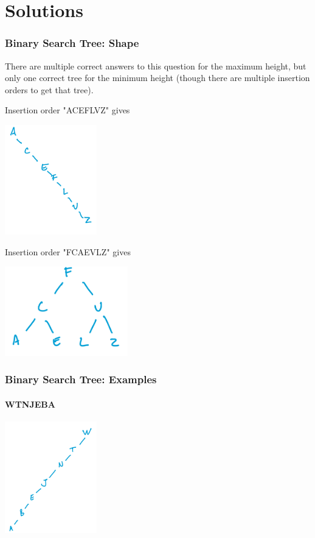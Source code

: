 \documentclass[twoside=false,DIV=14]{scrartcl}
\begin{document}
\newpage\setcounter{section}{0}
\part*{Solutions}

\section{Binary Search Tree: Shape}
\begin{note}
There are multiple correct answers to this question for the maximum height, but only one correct tree for the minimum height (though there are multiple insertion orders to get that tree).
\end{note}

Insertion order "ACEFLVZ" gives 
\begin{center}
\includegraphics[width=0.3\textwidth]{max_height.jpeg}
\end{center}

Insertion order "FCAEVLZ" gives
\begin{center}
 \includegraphics[width=0.4\textwidth]{min_height.jpeg}
 \end{center}

\section{Binary Search Tree: Examples}
\subsection{WTNJEBA}
\begin{center}
  \includegraphics[width=0.3\textwidth]{2_1.jpeg}
  \end{center}
 
\end{document}
